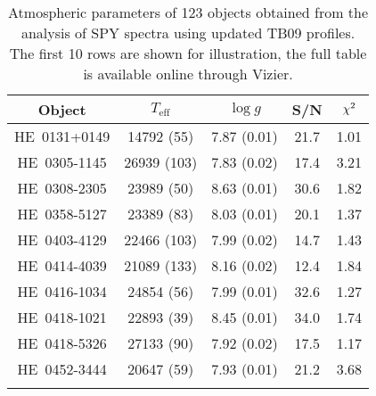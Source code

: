 \documentclass[fleqn,usenatbib, useAMS]{mnras}
\newcommand{\Teff}{\mbox{$T_{\mathrm{eff}}$}}
\newcommand{\logg}{\mbox{$\log g$}}
\begin{document}
\begin{table*}
\centering
\caption{Atmospheric parameters of 123 objects \citep{Koester2009} obtained from the analysis of SPY spectra using updated TB09 profiles. The first 10 rows are shown for illustration, the full table is available online through Vizier.}
\begin{tabular}{ccccc} \hline
Object & \Teff & \logg & S/N & $\rm{\chi^2}$ \\\hline
HE\	0131+0149	&	14792	(55)	&	7.87	(0.01)	&	21.7	&	1.01	\\
HE\	0305-1145	&	26939	(103)	&	7.83	(0.02)	&	17.4	&	3.21	\\
HE\	0308-2305	&	23989	(50)	&	8.63	(0.01)	&	30.6	&	1.82	\\
HE\	0358-5127	&	23389	(83)	&	8.03	(0.01)	&	20.1	&	1.37	\\
HE\	0403-4129	&	22466	(103)	&	7.99	(0.02)	&	14.7	&	1.43	\\
HE\	0414-4039	&	21089	(133)	&	8.16	(0.02)	&	12.4	&	1.84	\\
HE\	0416-1034	&	24854	(56)	&	7.99	(0.01)	&	32.6	&	1.27	\\
HE\	0418-1021	&	22893	(39)	&	8.45	(0.01)	&	34.0	&	1.74	\\
HE\	0418-5326	&	27133	(90)	&	7.92	(0.02)	&	17.5	&	1.17	\\
HE\	0452-3444	&	20647	(59)	&	7.93	(0.01)	&	21.2	&	3.68	\\
\hline
\label{tab:K09u_params}
\end{tabular}
\end{table*}
\end{document}
